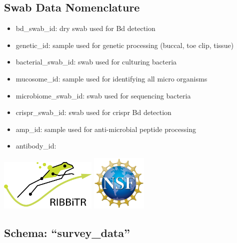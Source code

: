 \documentclass[
]{article}
\providecommand{\tightlist}{%
  \setlength{\itemsep}{0pt}\setlength{\parskip}{0pt}}
\begin{document}
\hypertarget{swab-data-nomenclature}{%
\subsection{Swab Data Nomenclature}\label{swab-data-nomenclature}}

\begin{itemize}
\tightlist
\item
  bd\_swab\_id: dry swab used for Bd detection
\item
  genetic\_id: sample used for genetic processing (buccal, toe clip,
  tissue)
\item
  bacterial\_swab\_id: swab used for culturing bacteria
\item
  mucosome\_id: sample used for identifying all micro organisms
\item
  microbiome\_swab\_id: swab used for sequencing bacteria
\item
  crispr\_swab\_id: swab used for crispr Bd detection
\item
  amp\_id: sample used for anti-microbial peptide processing
\item
  antibody\_id:
\end{itemize}

\includegraphics[width=1.82292in,height=\textheight]{ribbitr.png}
\includegraphics[width=1.04167in,height=\textheight]{nsf_logo.png}

\hypertarget{schema-survey_data}{%
\subsection{Schema: ``survey\_data''}\label{schema-survey_data}}
\end{document}
